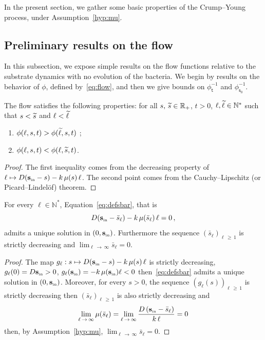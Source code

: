 \documentclass[AHL,Unicode,longabstracts,published]{cedram}
\newcommand{\RR}{\mathbb{R}}
\newcommand{\NN}{\mathbb{N}}
\newcommand{\Sin}{{\mathbf s}_{\textrm{\tiny\rm in}}}
\newcommand{\phit}{\phi_\textsf{t}^{-1}}
\newcommand{\phis}{\phi_{\textsf{s}_0}^{-1}}
\newcommand{\1}{\mathbf{1}}
\let\oldtilde\tilde
\renewcommand*{\tilde}[1]{\mathchoice{\widetilde{#1}}{\widetilde{#1}}{\oldtilde{#1}}{\oldtilde{#1}}}
\begin{document}
In the present section, we gather some basic properties of the Crump--Young process, under Assumption~\ref{hyp:mu}.



\subsection{Preliminary results on the flow}\label{sec.preliminary.flow}


In this subsection, we expose simple results on the flow functions relative to the substrate dynamics with no evolution of the bacteria. We begin by results on the behavior of $\phi$, defined by~\eqref{eq:flow}, and then we give bounds on $\phit$ and $\phis$.

\begin{lemm}\label{prop.monotony.flow}
The flow satisfies the following properties: for all $s,\, \tilde s \in \RR_+$, $t> 0$, $\ell, \tilde \ell \in \NN^*$ such that $s< \tilde s$ and $\ell < \tilde \ell$
\begin{enumerate}
\item\label{lemmA.1} $\phi(\ell,s,t)>\phi(\tilde \ell,s,t)$ ;
\item\label{lemmA.2} $\phi(\ell,s,t)< \phi(\ell,\tilde s,t)$.
\end{enumerate}
\end{lemm}
\begin{proof}
The first inequality comes from the decreasing property of $\ell \mapsto D(\Sin-s)\linebreak-k\,\mu(s)\,\ell$. The second point comes from the Cauchy--Lipschitz (or Picard--Lindel\"of) theorem.
\end{proof}

\begin{lemm}\label{lem:defsbar}
For every $\ell\in \NN^*$, Equation~\eqref{eq:defsbar}, that is
\[
D(\Sin-\bar s_\ell)-k\,\mu(\bar s_\ell)\,\ell = 0\,,
\]
admits a unique solution in $(0,\Sin)$. Furthermore the sequence $(\bar s_\ell)_{\ell\,\geq\,1}$ is strictly decreasing and $\lim_{\ell\,\to\,\infty} \bar s_\ell = 0$.
\end{lemm}
\begin{proof}
The map $g_\ell:s\mapsto D(\Sin-s)-k\,\mu(s)\,\ell$ is strictly decreasing, $g_\ell(0)=D \Sin>0$, $g_\ell(\Sin)=-k\,\mu(\Sin)\ell<0$ then~\eqref{eq:defsbar} admits a unique solution in $(0,\Sin)$. Moreover, for every $s> 0$, the sequence $(g_\ell(s))_{\ell\,\geq\,1}$ is strictly decreasing then $(\bar s_\ell)_{\ell\,\geq\,1}$ is also strictly decreasing and
\[
\lim_{\ell\,\to\,\infty} \mu(\bar s_\ell) = \lim_{\ell\,\to\,\infty} \frac{D\,(\Sin-\bar s_\ell)}{k\,\ell} = 0
\]
then, by Assumption~\ref{hyp:mu}, $\lim_{\ell\,\to\,\infty} \bar s_\ell = 0$.
\end{proof}
\end{document}
